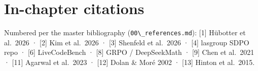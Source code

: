 \section{In-chapter citations}\label{in-chapter-citations}

Numbered per the master bibliography (\passthrough{\lstinline!00\_references.md!}): {[}1{]} Hübotter et al.~2026 · {[}2{]} Kim et al.~2026 · {[}3{]} Shenfeld et al.~2026 · {[}4{]} lasgroup SDPO repo · {[}6{]} LiveCodeBench · {[}8{]} GRPO / DeepSeekMath · {[}9{]} Chen et al.~2021 · {[}11{]} Agarwal et al.~2023 · {[}12{]} Dolan \& Moré 2002 · {[}13{]} Hinton et al.~2015.
